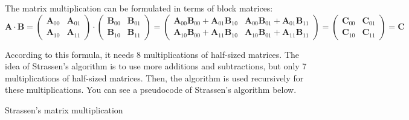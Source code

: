 \documentclass{article}
\begin{document}
The matrix multiplication can be formulated in terms of block matrices:
$$
\mathbf{A} \cdot \mathbf{B} =
\begin{pmatrix}
\mathbf{A}_{00} & \mathbf{A}_{01} \\
\mathbf{A}_{10} & \mathbf{A}_{11} 
\end{pmatrix}
\cdot
\begin{pmatrix}
\mathbf{B}_{00} & \mathbf{B}_{01} \\
\mathbf{B}_{10} & \mathbf{B}_{11} 
\end{pmatrix}
=
\begin{pmatrix}
\mathbf{A}_{00}\mathbf{B}_{00}+\mathbf{A}_{01}\mathbf{B}_{10} & \mathbf{A}_{00}\mathbf{B}_{01}+\mathbf{A}_{01}\mathbf{B}_{11} \\
\mathbf{A}_{10}\mathbf{B}_{00}+\mathbf{A}_{11}\mathbf{B}_{10} & \mathbf{A}_{10}\mathbf{B}_{01}+\mathbf{A}_{11}\mathbf{B}_{11} 
\end{pmatrix}
=
\begin{pmatrix}
\mathbf{C}_{00} & \mathbf{C}_{01} \\
\mathbf{C}_{10} & \mathbf{C}_{11} 
\end{pmatrix}
= \mathbf{C}
$$

According to this formula, it needs 8 multiplications of half-sized matrices. 
The idea of Strassen's algorithm is to use more additions and subtractions,
but only 7 multiplications of half-sized matrices. Then, the algorithm is used recursively
for these multiplications. You can see a pseudocode of Strassen's algorithm below.

\begin{algorithm}[H] 
\caption{Strassen's matrix multiplication}
\label{alg:strassen}
\begin{algorithmic}[1]
\Statex
{}
		\State \Return {}
	\EndIf
	 	
	\State {}
\EndFunction
\end{algorithmic}
\end{algorithm}
\end{document}
